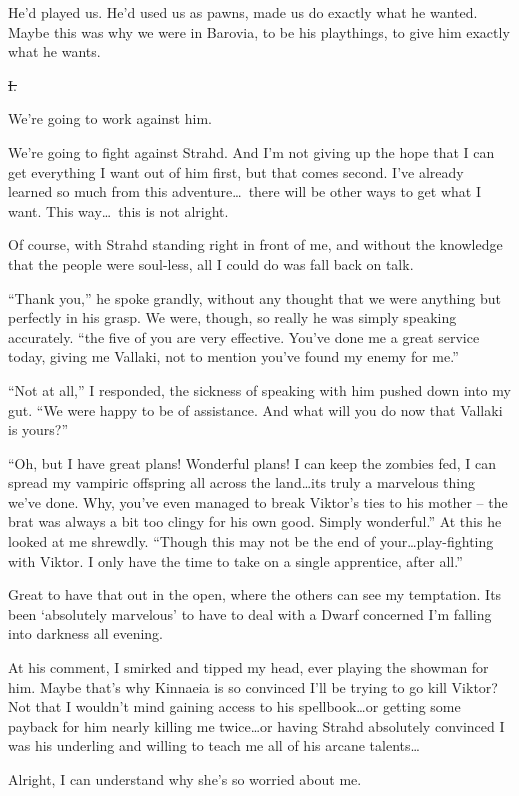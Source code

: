 He'd played us. He'd used us as pawns, made us do exactly what he wanted. Maybe this was why we were in Barovia, to be his playthings, to give him exactly what he wants.

\st{I.}

We're going to work against him.

We're going to fight against Strahd. And I'm not giving up the hope that I can get everything I want out of him first, but that comes second. I've already learned so much from this adventure\dots\ there will be other ways to get what I want. This way\dots\ this is not alright.

Of course, with Strahd standing right in front of me, and without the knowledge that the people were soul-less, all I could do was fall back on talk.

``Thank you,'' he spoke grandly, without any thought that we were anything but perfectly in his grasp. We were, though, so really he was simply speaking accurately. ``the five of you are very effective. You've done me a great service today, giving me Vallaki, not to mention you've found my enemy for me.''

``Not at all,'' I responded, the sickness of speaking with him pushed down into my gut. ``We were happy to be of assistance. And what will you do now that Vallaki is yours?''

``Oh, but I have great plans! Wonderful plans! I can keep the zombies fed, I can spread my vampiric offspring all across the land\dots its truly a marvelous thing we've done. Why, you've even managed to break Viktor's ties to his mother -- the brat was always a bit too clingy for his own good. Simply wonderful.'' At this he looked at me shrewdly. ``Though this may not be the end of your\dots play-fighting with Viktor. I only have the time to take on a single apprentice, after all.''

Great to have that out in the open, where the others can see my temptation. Its been `absolutely marvelous' to have to deal with a Dwarf concerned I'm falling into darkness all evening.

At his comment, I smirked and tipped my head, ever playing the showman for him. Maybe that's why Kinnaeia is so convinced I'll be trying to go kill Viktor? Not that I wouldn't mind gaining access to his spellbook\dots or getting some payback for him nearly killing me twice\dots or having Strahd absolutely convinced I was his underling and willing to teach me all of his arcane talents\dots

Alright, I can understand why she's so worried about me.

